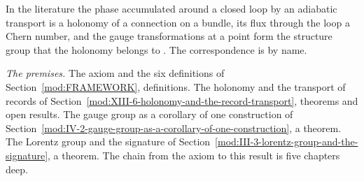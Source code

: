 \begin{chbridge}
In the literature the phase accumulated around a closed loop by an adiabatic transport is a holonomy of a connection on a bundle, its flux through the loop a Chern number, and the gauge transformations at a point form the structure group that the holonomy belongs to \cite{Berry1984,Wilson1974}. The correspondence is by name.
\end{chbridge}
\begin{chproof}[census]
\textit{The premises.} The axiom and the six definitions of Section~\ref{mod:FRAMEWORK}, definitions. The holonomy and the transport of records of Section~\ref{mod:XIII-6-holonomy-and-the-record-transport}, theorems and open results. The gauge group as a corollary of one construction of Section~\ref{mod:IV-2-gauge-group-as-a-corollary-of-one-construction}, a theorem. The Lorentz group and the signature of Section~\ref{mod:III-3-lorentz-group-and-the-signature}, a theorem. The chain from the axiom to this result is five chapters deep.


\end{chproof}
